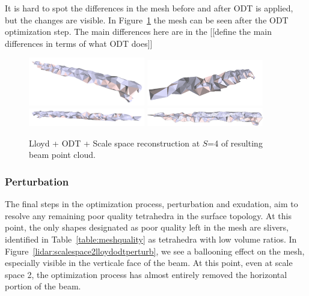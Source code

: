 \documentclass[12pt]{drexelthesis}
\let\Oldsubsubsection\subsubsection
\renewcommand{\subsubsection}{\FloatBarrier\Oldsubsubsection}
\begin{document}
It is hard to spot the differences in the mesh before and after ODT is applied, but the changes are visible. In Figure~\ref{lidar:scalespace4lloydodt} the mesh can be seen after the ODT optimization step. The main differences here are in the [[define the main differences in terms of what ODT does]]

\begin{figure}[!ht]
	\centering
		\includegraphics[width=2in]{real-lab-scans/meshed/optimized/scalespace4lloydodt00.png}
		\includegraphics[width=2in]{real-lab-scans/meshed/optimized/scalespace4lloydodt01.png}
		\includegraphics[width=2in]{real-lab-scans/meshed/optimized/scalespace4lloydodt02.png}
		\includegraphics[width=2in]{real-lab-scans/meshed/optimized/scalespace4lloydodt03.png}
		\caption[Lloyd + ODT + Scale space reconstruction at $S$=4 of segmented LiDAR data]{\centering Lloyd + ODT + Scale space reconstruction at $S$=4 of resulting beam point cloud.}
	\label{lidar:scalespace4lloydodt}
\end{figure}

\subsubsection{Perturbation}

The final steps in the optimization process, perturbation and exudation, aim to resolve any remaining poor quality tetrahedra in the surface topology. At this point, the only shapes designated as poor quality left in the mesh are slivers, identified in Table~\ref{table:meshquality} as tetrahedra with low volume ratios. In Figure~\ref{lidar:scalespace2lloydodtperturb}, we see a ballooning effect on the mesh, especially visible in the verticale face of the beam. At this point, even at scale space 2, the optimization process has almost entirely removed the horizontal portion of the beam.
\end{document}
